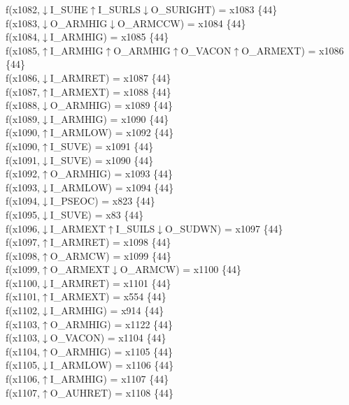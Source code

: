 f(x1082,$\downarrow$I\_SUHE$\uparrow$I\_SURLS$\downarrow$O\_SURIGHT) = x1083 \{44\} \\  
f(x1083,$\downarrow$O\_ARMHIG$\downarrow$O\_ARMCCW) = x1084 \{44\} \\  
f(x1084,$\downarrow$I\_ARMHIG) = x1085 \{44\} \\  
f(x1085,$\uparrow$I\_ARMHIG$\uparrow$O\_ARMHIG$\uparrow$O\_VACON$\uparrow$O\_ARMEXT) = x1086 \{44\} \\  
f(x1086,$\downarrow$I\_ARMRET) = x1087 \{44\} \\  
f(x1087,$\uparrow$I\_ARMEXT) = x1088 \{44\} \\  
f(x1088,$\downarrow$O\_ARMHIG) = x1089 \{44\} \\  
f(x1089,$\downarrow$I\_ARMHIG) = x1090 \{44\} \\  
f(x1090,$\uparrow$I\_ARMLOW) = x1092 \{44\} \\  
f(x1090,$\uparrow$I\_SUVE) = x1091 \{44\} \\  
f(x1091,$\downarrow$I\_SUVE) = x1090 \{44\} \\  
f(x1092,$\uparrow$O\_ARMHIG) = x1093 \{44\} \\  
f(x1093,$\downarrow$I\_ARMLOW) = x1094 \{44\} \\  
f(x1094,$\downarrow$I\_PSEOC) = x823 \{44\} \\  
f(x1095,$\downarrow$I\_SUVE) = x83 \{44\} \\  
f(x1096,$\downarrow$I\_ARMEXT$\uparrow$I\_SUILS$\downarrow$O\_SUDWN) = x1097 \{44\} \\  
f(x1097,$\uparrow$I\_ARMRET) = x1098 \{44\} \\  
f(x1098,$\uparrow$O\_ARMCW) = x1099 \{44\} \\  
f(x1099,$\uparrow$O\_ARMEXT$\downarrow$O\_ARMCW) = x1100 \{44\} \\  
f(x1100,$\downarrow$I\_ARMRET) = x1101 \{44\} \\  
f(x1101,$\uparrow$I\_ARMEXT) = x554 \{44\} \\  
f(x1102,$\downarrow$I\_ARMHIG) = x914 \{44\} \\  
f(x1103,$\uparrow$O\_ARMHIG) = x1122 \{44\} \\  
f(x1103,$\downarrow$O\_VACON) = x1104 \{44\} \\  
f(x1104,$\uparrow$O\_ARMHIG) = x1105 \{44\} \\  
f(x1105,$\downarrow$I\_ARMLOW) = x1106 \{44\} \\  
f(x1106,$\uparrow$I\_ARMHIG) = x1107 \{44\} \\  
f(x1107,$\uparrow$O\_AUHRET) = x1108 \{44\} \\  
